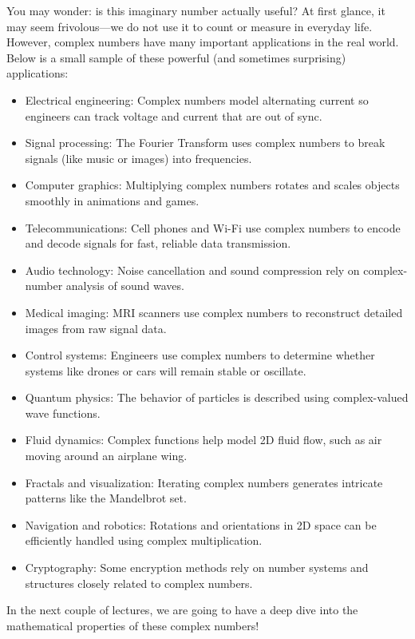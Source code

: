 \documentclass[twoside, 10pt]{article}
\begin{document}
You may wonder: is this imaginary number actually useful? At first glance, it may seem frivolous—we do not use it to count or measure in everyday life. However, complex numbers have many important applications in the real world. Below is a small sample of these powerful (and sometimes surprising) applications:
\begin{itemize}
    \item Electrical engineering: Complex numbers model alternating current so engineers can track voltage and current that are out of sync.
    
    \item Signal processing: The Fourier Transform uses complex numbers to break signals (like music or images) into frequencies.
    
    \item Computer graphics: Multiplying complex numbers rotates and scales objects smoothly in animations and games.
    
    \item Telecommunications: Cell phones and Wi-Fi use complex numbers to encode and decode signals for fast, reliable data transmission.
    
    \item Audio technology: Noise cancellation and sound compression rely on complex-number analysis of sound waves.
    
    \item Medical imaging: MRI scanners use complex numbers to reconstruct detailed images from raw signal data.
    
    \item Control systems: Engineers use complex numbers to determine whether systems like drones or cars will remain stable or oscillate.
    
    \item Quantum physics: The behavior of particles is described using complex-valued wave functions.
    
    \item Fluid dynamics: Complex functions help model 2D fluid flow, such as air moving around an airplane wing.
    
    \item Fractals and visualization: Iterating complex numbers generates intricate patterns like the Mandelbrot set.
    
    \item Navigation and robotics: Rotations and orientations in 2D space can be efficiently handled using complex multiplication.
    
    \item Cryptography: Some encryption methods rely on number systems and structures closely related to complex numbers.
\end{itemize}
In the next couple of lectures, we are going to have a deep dive into the mathematical properties of these complex numbers!
\end{document}
